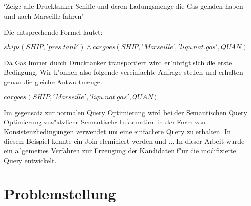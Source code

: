 \begin{center}
\begin{minipage}{10cm}
`Zeige alle Drucktanker Schiffe und deren Ladungsmenge die Gas geladen haben
und nach Marseille fahren'
\end{minipage}
\end{center}

Die entsprechende Formel lautet:

\begin{center}
$ships(SHIP,'pres. tank') \wedge cargoes(SHIP,'Marseille','liqu. nat. gas',QUAN)$
\end{center}

Da Gas immer durch Drucktanker transportiert wird er"ubrigt sich die erste Bedingung. Wir
k"onnen also folgende vereinfachte Anfrage stellen und erhalten genau die gleiche Antwortmenge:

\begin{center}
$cargoes(SHIP,'Marseille','liqu. nat. gas',QUAN)$
\end{center}

Im gegensatz zur normalen Query Optimierung wird bei der Semantischen Query Optimierung 
zus"atzliche Semantische Information in der Form von Konsistenzbedingungen verwendet um eine 
einfachere Query zu erhalten. In diesem Beispiel konnte ein Join eleminiert werden und ...
In dieser Arbeit wurde ein allgemeines Verfahren zur Erzeugung der Kandidaten f"ur die 
modifizierte Query entwickelt.

\section{Problemstellung}


